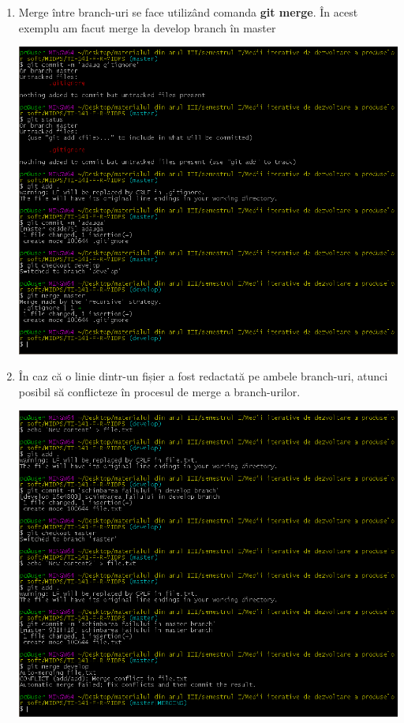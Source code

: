 \begin{enumerate}
\item Merge între branch-uri se face utilizând comanda \textbf{git merge}. În acest exemplu am facut merge la develop branch în master

\begin{minipage}{\linewidth}
	\centering
	\includegraphics[width=17cm]{mrg09}
\end{minipage}
\break

\item În caz că o linie dintr-un fișier a fost redactată pe ambele branch-uri, atunci posibil să conflicteze în procesul de merge a branch-urilor.

\begin{minipage}{\linewidth}
	\centering
	\includegraphics[width=17cm]{conflict10}
\end{minipage}
\break


\end{enumerate}
